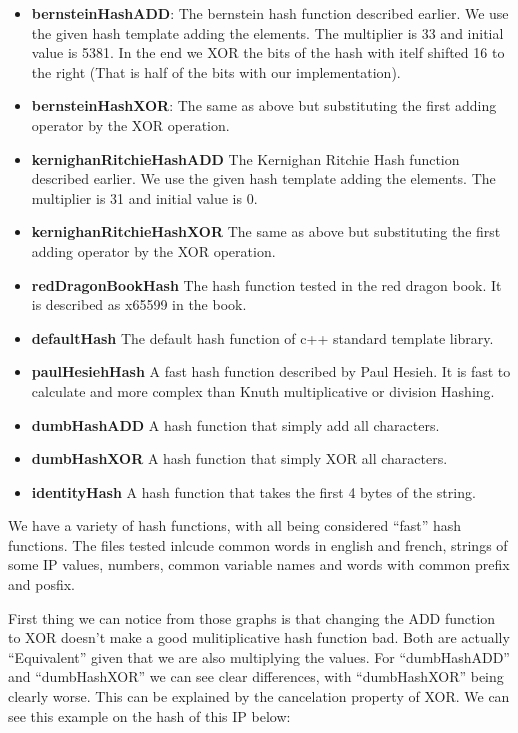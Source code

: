 \begin{itemize}
\item \textbf{bernsteinHashADD}: The bernstein hash function described earlier. We use the given hash template adding the elements. The multiplier is 33 and initial value is 5381. In the end we XOR the bits of the hash with itelf shifted 16 to the right (That is half of the bits with our implementation).
  
\item \textbf{bernsteinHashXOR}: The same as above but substituting the first adding operator by the XOR operation.

\item \textbf{kernighanRitchieHashADD} The Kernighan Ritchie Hash function described earlier. We use the given hash template adding the elements. The multiplier is 31 and initial value is 0.

\item \textbf{kernighanRitchieHashXOR} The same as above but substituting the first adding operator by the XOR operation.

\item \textbf{redDragonBookHash} The hash function tested in the red dragon book. It is described as x65599 in the book.

\item \textbf{defaultHash} The default hash function of c++ standard template library.

\item \textbf{paulHesiehHash} A fast hash function described by Paul Hesieh. It is fast to calculate and more complex than Knuth multiplicative or division Hashing.
  
\item \textbf{dumbHashADD} A hash function that simply add all characters.

\item \textbf{dumbHashXOR} A hash function that simply XOR all characters.

\item \textbf{identityHash} A hash function that takes the first 4 bytes of the string.  
\end{itemize}

We have a variety of hash functions, with all being considered ``fast'' hash functions. The files tested inlcude common words in english and french, strings of some IP values, numbers, common variable names and words with common prefix and posfix.

First thing we can notice from those graphs is that changing the ADD function to XOR doesn't make a good mulitiplicative hash function bad. Both are actually ``Equivalent'' given that we are also multiplying the values. For ``dumbHashADD'' and ``dumbHashXOR'' we can see clear differences, with ``dumbHashXOR'' being clearly worse. This can be explained by the cancelation property of XOR. We can see this example on the hash of this IP below:


